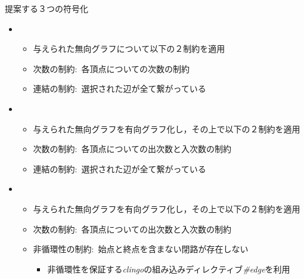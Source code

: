 \documentclass[dvipdfmx,11pt]{beamer}
\begin{document}
\begin{frame}{提案する３つの符号化}
  \begin{itemize}
  \item {}
    \begin{itemize}
    \item 与えられた無向グラフについて以下の２制約を適用
    \item \alert{次数の制約}:\ 各頂点についての次数の制約
    \item \alert{連結の制約}:\ 選択された辺が全て繋がっている
    \end{itemize}
  \item {}
    \begin{itemize}
    \item 与えられた無向グラフを有向グラフ化し，その上で以下の２制約を適用
    \item \alert{次数の制約}:\ 各頂点についての出次数と入次数の制約
    \item \alert{連結の制約}:\ 選択された辺が全て繋がっている
    \end{itemize}
  \item {}
    \begin{itemize}
    \item 与えられた無向グラフを有向グラフ化し，その上で以下の２制約を適用
    \item \alert{次数の制約}:\ 各頂点についての出次数と入次数の制約
    \item \alert{非循環性の制約}:\ 始点と終点を含まない閉路が存在しない
      \begin{itemize}
      \item 非循環性を保証する\textit{clingo}の組み込みディレクティブ\textit{\#edge}を利用
        \end{itemize}
    \end{itemize}
  \end{itemize}
\end{frame}
\end{document}
